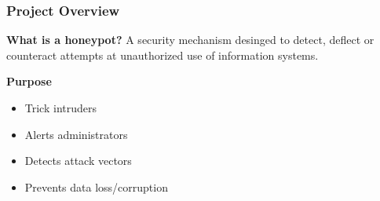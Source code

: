 \begin{frame}
\frametitle{Project Overview}

\begin{block}{\textbf{What is a honeypot?}}
A security mechanism desinged to detect, deflect or counteract attempts at unauthorized use of information systems.
\end{block}
 
\textbf{Purpose}
\begin{itemize}
\item Trick intruders
\item Alerts administrators
\item Detects attack vectors
\item Prevents data loss/corruption
\end{itemize}
\end{frame}
